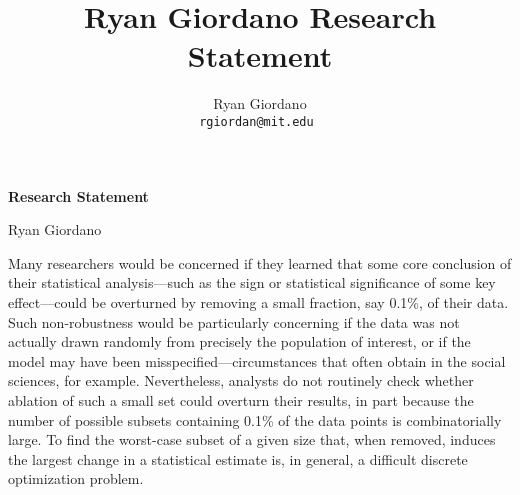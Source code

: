 
\usepackage{enumitem}

\usepackage{geometry}
\geometry{top=1.in}
\geometry{left=1.5in}
\geometry{right=1.5in}

\title{Ryan Giordano Research Statement}

\author{
  Ryan Giordano \\ \texttt{rgiordan@mit.edu }
}



\begin{minipage}[t]{0.5\textwidth}
\hspace{-2em} %
{\bf \LARGE Research Statement}\\
\end{minipage}
\begin{minipage}[t]{0.5\textwidth}
        \hspace{7.5em} %
        {\LARGE Ryan Giordano}
\end{minipage}

Many researchers would be concerned if they learned that some core conclusion of
their statistical analysis---such as the sign or statistical significance of some
key effect---could be overturned by removing a small fraction, say 0.1\%, of
their data.  Such non-robustness would be particularly concerning if the data
was not actually drawn randomly from precisely the population of interest, or if
the model may have been misspecified---circumstances that often obtain in  the
social sciences, for example.  Nevertheless, analysts do not routinely check
whether ablation of such a small set could overturn their results, in part
because the number of possible subsets containing 0.1\% of the data points is
combinatorially large.  To find the worst-case subset of a given size that, when
removed, induces the largest change in a statistical estimate is, in general, a
difficult discrete optimization problem.

